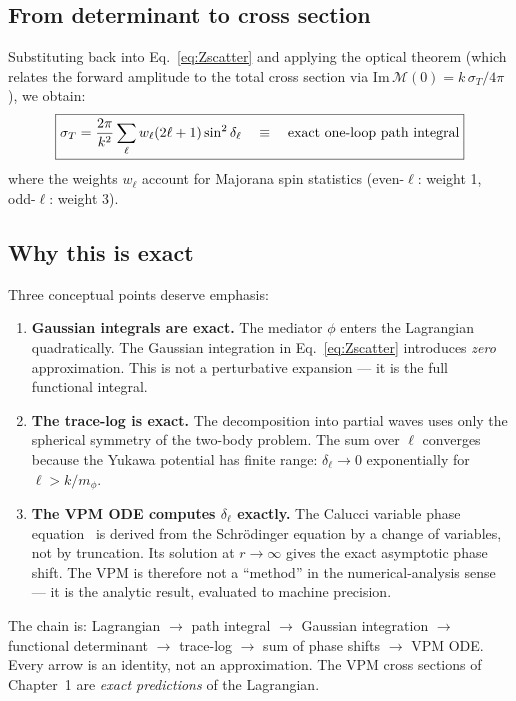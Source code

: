 \subsection{From determinant to cross section}

Substituting back into Eq.~\eqref{eq:Zscatter} and applying the optical theorem
(which relates the forward amplitude to the total cross section via
$\mathrm{Im}\,\mathcal{M}(0) = k\,\sigma_T/4\pi$), we obtain:
\begin{equation}
  \boxed{\sigma_T = \frac{2\pi}{k^2}\sum_\ell w_\ell(2\ell+1)\sin^2\delta_\ell
  \quad\equiv\quad \text{exact one-loop path integral}}
\end{equation}
where the weights $w_\ell$ account for Majorana spin statistics
(even-$\ell$: weight 1, odd-$\ell$: weight 3).

\subsection{Why this is exact}

Three conceptual points deserve emphasis:

\begin{enumerate}
\item \textbf{Gaussian integrals are exact.} The mediator $\phi$ enters
      the Lagrangian quadratically. The Gaussian integration in
      Eq.~\eqref{eq:Zscatter} introduces \textit{zero} approximation.
      This is not a perturbative expansion --- it is the full functional
      integral.

\item \textbf{The trace-log is exact.} The decomposition into partial
      waves uses only the spherical symmetry of the two-body problem.
      The sum over $\ell$ converges because the Yukawa potential has
      finite range: $\delta_\ell \to 0$ exponentially for
      $\ell > k/m_\phi$.

\item \textbf{The VPM ODE computes $\delta_\ell$ exactly.} The Calucci
      variable phase equation~\cite{Calucci1969} is derived from the
      Schr\"odinger equation by a change of variables, not by truncation.
      Its solution at $r \to \infty$ gives the exact asymptotic phase
      shift. The VPM is therefore not a ``method'' in the numerical-analysis
      sense --- it is the analytic result, evaluated to machine precision.
\end{enumerate}

The chain is: Lagrangian $\to$ path integral $\to$ Gaussian integration
$\to$ functional determinant $\to$ trace-log $\to$ sum of phase shifts
$\to$ VPM ODE. Every arrow is an identity, not an approximation.
The VPM cross sections of Chapter~1 are \emph{exact predictions}
of the Lagrangian.

